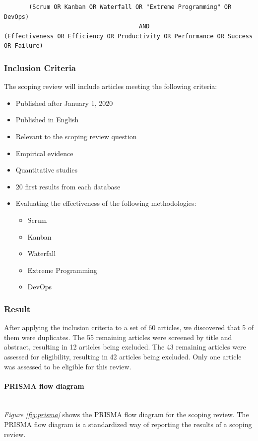 \documentclass[12pt]{article}
\newcommand{\subsubsubsection}[1]{\paragraph{#1}\mbox{}\\}
\begin{document}
\begin{adjustwidth}{-4em}{0pt}
\begin{verbatim}
       (Scrum OR Kanban OR Waterfall OR "Extreme Programming" OR DevOps) 
                                      AND
(Effectiveness OR Efficiency OR Productivity OR Performance OR Success OR Failure)
\end{verbatim}
\end{adjustwidth}

\subsubsection{Inclusion Criteria}
The scoping review will include articles meeting the following criteria:
\begin{itemize}
  \item Published after January 1, 2020
  \item Published in English
  \item Relevant to the scoping review question
  \item Empirical evidence
  \item Quantitative studies
  \item 20 first results from each database
  \item Evaluating the effectiveness of the following methodologies:
  \begin{itemize}
    \item Scrum
    \item Kanban
    \item Waterfall
    \item Extreme Programming
    \item DevOps
  \end{itemize}
\end{itemize}

\subsubsection{Result}
After applying the inclusion criteria to a set of 60 articles, we discovered that 5 of them were duplicates.
The 55 remaining articles were screened by title and abstract, resulting in 12 articles being excluded.
The 43 remaining articles were assessed for eligibility, resulting in 42 articles being excluded.
Only one article was assessed to be eligible for this review.

\subsubsubsection{PRISMA flow diagram}
\textit{Figure \ref{fig:prisma}} shows the PRISMA \cite{PRISMAStatement} flow diagram for the scoping review.
The PRISMA flow diagram is a standardized way of reporting the results of a scoping review.
\end{document}
